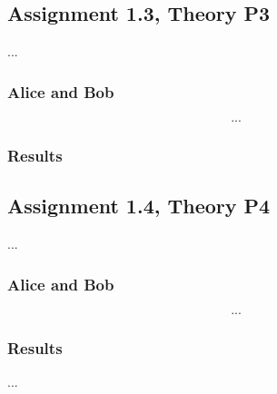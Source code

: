 \documentclass[a4paper]{article}
\begin{document}
\subsection{Assignment 1.3, Theory P3}
...
\subsubsection{Alice and Bob}
\begin{eqnarray*}
...
\end{eqnarray*}
\subsubsection{Results}

\subsection{Assignment 1.4, Theory P4}
...
\subsubsection{Alice and Bob}
\begin{eqnarray*}
...
\end{eqnarray*}
\subsubsection{Results}
...
\end{document}
